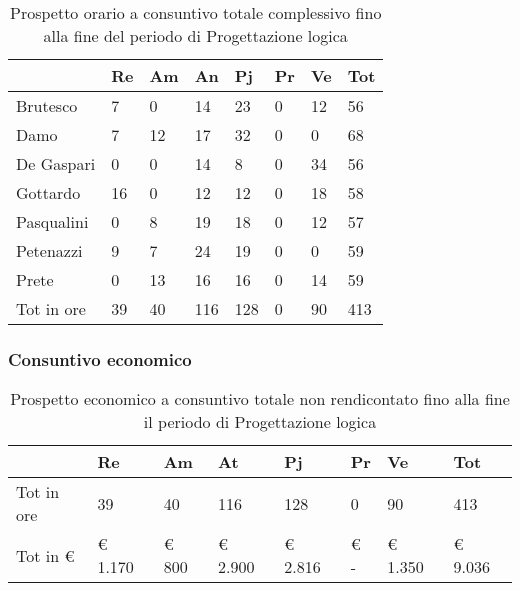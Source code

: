 						\begin{table}[h] \begin{center} \begin{tabular}{llllllll}																					
						\toprule																					
							&	Re		&	Am		&	An		&	Pj		&	Pr		&	Ve		&	Tot	\\
						\midrule																					
						Brutesco	&	7		&	0		&	14		&	23		&	0		&	12		&	56	\\
						Damo		&	7		&	12		&	17		&	32		&	0		&	0		&	68	\\
						De Gaspari	&	0		&	0		&	14		&	8		&	0		&	34		&	56	\\
						Gottardo	&	16		&	0		&	12		&	12		&	0		&	18		&	58	\\
						Pasqualini	&	0		&	8		&	19		&	18		&	0		&	12		&	57	\\
						Petenazzi	&	9		&	7		&	24		&	19		&	0		&	0		&	59	\\
						Prete		&	0		&	13		&	16		&	16		&	0		&	14		&	59	\\
						\midrule																					
						Tot in ore	&	39		&	40		&	116		&	128		&	0		&	90		&	413	\\
						\bottomrule																					
						\end{tabular} \end{center} \caption{Prospetto orario a consuntivo totale complessivo fino alla fine del periodo di																						
						Progettazione logica																						
						}\label{tab:h_		Pl			} \end{table}
		\subsubsection{Consuntivo economico}
						\begin{table}[H] \begin{center} \begin{tabular}{llllllll}
						\toprule
							&	\textbf{Re}	&	\textbf{Am}	&	\textbf{At}	&	\textbf{Pj}	&	\textbf{Pr}	&	\textbf{Ve}	&	\textbf{Tot}\\
						\midrule																					
						Tot in ore	&	39		&	40		&	116		&	128		&	0		&	90		&	413	\\
						Tot in €	&	 € 1.170 		 & 	 € 800 		 & 	 € 2.900 		 & 	 € 2.816 		 & 	 € -   		 & 	 € 1.350 		 & 	 € 9.036 	\\
						\bottomrule			
						\end{tabular} \end{center} \caption{Prospetto economico a consuntivo totale non rendicontato fino alla fine il periodo di																						
												Progettazione logica				
						}\label{tab:s_TotaleNonRendicontato} \end{table}
	
